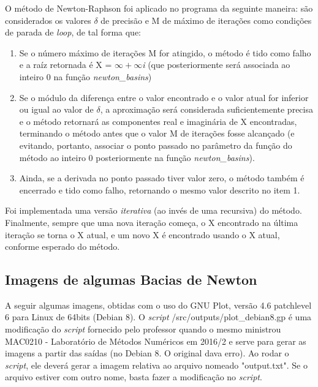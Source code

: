 \documentclass[11pt]{article}
\begin{document}
\indent\indent O método de Newton-Raphson foi aplicado no programa da seguinte maneira: são considerados os valores $\delta$ de precisão e M de máximo de iterações como condições de parada de \textit{loop}, de tal forma que:
\begin{enumerate}
  \item Se o número máximo de iterações M for atingido, o método é tido como falho e a raíz retornada é X = $\infty + \infty$\textit{i} (que posteriormente será associada ao inteiro 0 na função \textit{newton\_basins})
  \item Se o módulo da diferença entre o valor encontrado e o valor atual for inferior ou igual ao valor de $\delta$, a aproximação será considerada suficientemente precisa e o método retornará as componentes real e imaginária de X
  encontradas, terminando o método antes que o valor M de iterações fosse alcançado (e evitando, portanto, associar o ponto passado no parâmetro da função do método ao inteiro 0 posteriormente na função \textit{newton\_basins}).
  \item Ainda, se a derivada no ponto passado tiver valor zero, o método também é encerrado e tido como falho, retornando o mesmo valor descrito no item 1.
\end{enumerate}

Foi implementada uma versão \textit{iterativa} (ao invés de uma recursiva) do método. Finalmente, sempre que uma nova iteração começa, o X encontrado na última iteração se torna o X atual, e um novo X é encontrado usando o X atual,
conforme esperado do método.

\subsection{Imagens de algumas Bacias de Newton}

\indent\indent A seguir algumas imagens, obtidas com o uso do GNU Plot, versão 4.6 patchlevel 6 para Linux de 64bits (Debian 8). O \textit{script} /src/outputs/plot\_debian8.gp é uma modificação do \textit{script} fornecido
pelo professor quando o mesmo ministrou MAC0210 - Laboratório de Métodos Numéricos em 2016/2 e serve para gerar as imagens a partir das saídas (no Debian 8. O original dava erro). Ao rodar o \textit{script}, ele deverá
gerar a imagem relativa ao arquivo nomeado "output.txt". Se o arquivo estiver com outro nome, basta fazer a modificação no \textit{script}.
\end{document}
